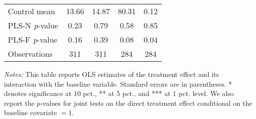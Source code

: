 \begin{table}[ht]
{\begin{threeparttable}
\begin{tabular}{l*{4}{c}}
Control mean    &    13.66         &    14.87         &    80.31         &     0.12         \\
PLS-N \emph{p}-value&     0.23         &     0.79         &     0.58         &     0.85         \\
PLS-F \emph{p}-value&     0.16         &     0.39         &     0.08         &     0.04         \\
Observations    &      311         &      311         &      284         &      284         \\
\bottomrule \end{tabular} \begin{tablenotes}[flushleft] \footnotesize \item \emph{Notes:} This table reports OLS estimates of the treatment effect and its interaction with the baseline variable. Standard errors are in parentheses. * denotes significance at 10 pct., ** at 5 pct., and *** at 1 pct. level. We also report the \(p\)-values for joint tests on the direct treatment effect conditional on the baseline covariate $= 1$. \end{tablenotes} \end{threeparttable} } \end{table}

